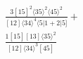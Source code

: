 \documentclass[varwidth, border=5pt]{standalone}
\begin{document}
\begin{my}
$\begin{gathered}
\scriptscriptstyle\frac{3[15]^2⟨35⟩^2⟨45⟩^2}{[12]⟨34⟩^4⟨5|1+2|5]}+\\
\scriptscriptstyle\frac{1[15][13]⟨35⟩^2}{[12]⟨34⟩^3[45]}\phantom{+}
\end{gathered}$
\end{my}
\end{document}

